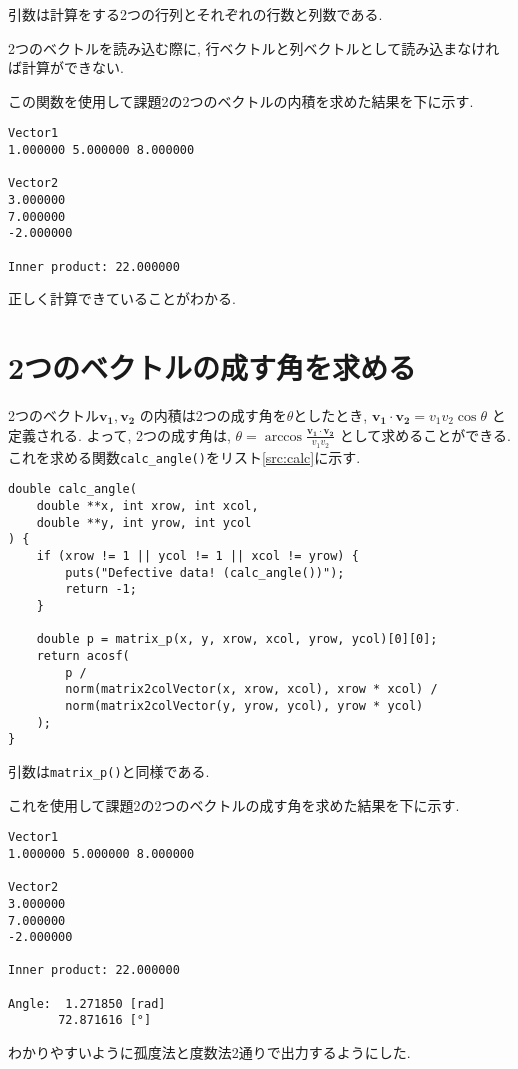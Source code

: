 \documentclass{jsarticle}
\begin{document}
        引数は計算をする2つの行列とそれぞれの行数と列数である.
        
        2つのベクトルを読み込む際に,
        行ベクトルと列ベクトルとして読み込まなければ計算ができない.

        この関数を使用して課題2の2つのベクトルの内積を求めた結果を下に示す.

        \begin{verbatim}
Vector1
1.000000 5.000000 8.000000 

Vector2
3.000000 
7.000000 
-2.000000 

Inner product: 22.000000
        \end{verbatim}

        正しく計算できていることがわかる.

    \section{2つのベクトルの成す角を求める}
        2つのベクトル$\bm{v_1}, \bm{v_2}$
        の内積は2つの成す角を$\theta$としたとき,
        $\bm{v_1} \cdot \bm{v_2} = v_1v_2\cos{\theta}$
        と定義される.
        よって, 2つの成す角は,
        $\displaystyle \theta = \arccos{\frac{\bm{v_1} \cdot \bm{v_2}}{v_1 v_2}}$
        として求めることができる.
        これを求める関数\verb|calc_angle()|をリスト\ref{src:calc}に示す.

        \begin{lstlisting}[caption=calc\_angle.c, label=src:calc]
double calc_angle(
    double **x, int xrow, int xcol, 
    double **y, int yrow, int ycol
) {
    if (xrow != 1 || ycol != 1 || xcol != yrow) {
        puts("Defective data! (calc_angle())");
        return -1;
    }

    double p = matrix_p(x, y, xrow, xcol, yrow, ycol)[0][0];
    return acosf(
        p /
        norm(matrix2colVector(x, xrow, xcol), xrow * xcol) /
        norm(matrix2colVector(y, yrow, ycol), yrow * ycol)
    );
}\end{lstlisting}

        引数は\verb|matrix_p()|と同様である.

        これを使用して課題2の2つのベクトルの成す角を求めた結果を下に示す.

        \begin{verbatim}
Vector1
1.000000 5.000000 8.000000 

Vector2
3.000000 
7.000000 
-2.000000 

Inner product: 22.000000

Angle:  1.271850 [rad]
       72.871616 [°]
        \end{verbatim}

        わかりやすいように孤度法と度数法2通りで出力するようにした.
\end{document}
